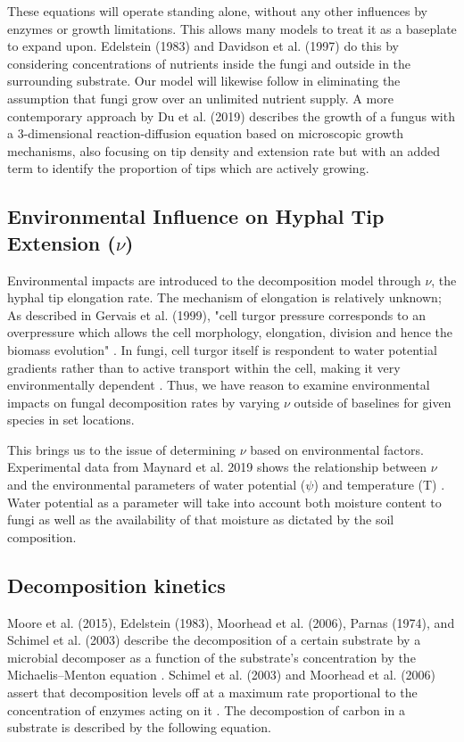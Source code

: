 \documentclass[12pt]{article}
\begin{document}
\begin{multicols}{2}
These equations will operate standing alone, without any other influences by enzymes or growth limitations. This allows many models to treat it as a baseplate to expand upon. Edelstein (1983) and Davidson et al. (1997) do this by considering concentrations of nutrients inside the fungi and outside in the surrounding substrate. Our model will likewise follow in eliminating the assumption that fungi grow over an unlimited nutrient supply. A more contemporary approach by Du et al. (2019) describes the growth of a fungus with a 3-dimensional reaction-diffusion equation based on microscopic growth mechanisms, also focusing on tip density and extension rate but with an added term to identify the proportion of tips which are actively growing. 

\subsection{Environmental Influence on Hyphal Tip Extension ($\nu$)}
Environmental impacts are introduced to the decomposition model through $\nu$, the hyphal tip elongation rate. The mechanism of elongation is relatively unknown\cite{Steinberg2007}; As described in Gervais et al. (1999), "cell turgor pressure corresponds to an overpressure which allows the cell morphology, elongation, division and hence the biomass evolution" \cite{Gervais1999}. In fungi, cell turgor itself is respondent to water potential gradients rather than to active transport within the cell, making it very environmentally dependent \cite{Gervais1999}. Thus, we have reason to examine environmental impacts on fungal decomposition rates by varying $\nu$ outside of baselines for given species in set locations.

This brings us to the issue of determining $\nu$ based on environmental factors. Experimental data from Maynard et al. 2019 shows the relationship between $\nu$ and the environmental parameters of water potential ($\psi$) and temperature (T) \cite{Maynard2019}.  Water potential as a parameter will take into account both moisture content to fungi as well as the availability of that moisture as dictated by the  soil composition.

\subsection{Decomposition kinetics}
Moore et al. (2015), Edelstein (1983), Moorhead et al. (2006), Parnas (1974), and Schimel et al. (2003) describe the decomposition of a certain substrate by a microbial decomposer as a function of the substrate's concentration by the Michaelis–Menton equation \cite{Moore}\cite{Edelstein1983}\cite{Moorhead2006}\cite{Parnas1975}\cite{Schimel2003}. Schimel et al. (2003) and Moorhead et al. (2006) assert that decomposition levels off at a maximum rate proportional to the concentration of enzymes acting on it \cite{Schimel2003}\cite{Moorhead2006}. The decompostion of carbon in a substrate is described by the following equation.


\end{multicols}
\end{document}
